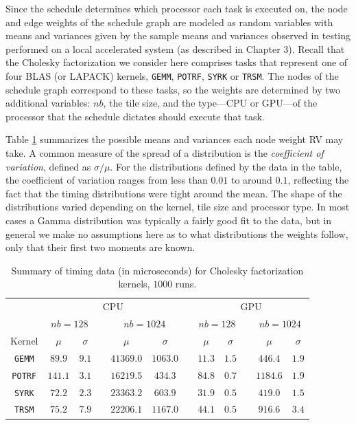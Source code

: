 \documentclass[12pt]{article}
\begin{document}
Since the schedule determines which processor each task is executed on, the node and edge weights of the schedule graph are modeled as random variables with means and variances given by the sample means and variances observed in testing performed on a local accelerated system (as described in Chapter 3). Recall that the Cholesky factorization we consider here comprises tasks that represent one of four BLAS (or LAPACK) kernels, {\tt GEMM}, {\tt POTRF}, {\tt SYRK} or {\tt TRSM}. The nodes of the schedule graph correspond to these tasks, so the weights are determined by two additional variables: $nb$, the tile size, and the type---CPU or GPU---of the processor that the schedule dictates should execute that task.

Table \ref{tb.cholesky_samples} summarizes the possible means and variances each node weight RV may take. A common measure of the spread of a distribution is the {\em coefficient of variation}, defined as $\sigma / \mu$. For the distributions defined by the data in the table, the coefficient of variation ranges from less than $0.01$ to around $0.1$, reflecting the fact that the timing distributions were tight around the mean. The shape of the distributions varied depending on the kernel, tile size and processor type. In most cases a Gamma distribution was typically a fairly good fit to the data, but in general we make no assumptions here as to what distributions the weights follow, only that their first two moments are known.           

\begin{table}
	\caption{Summary of timing data (in microseconds) for Cholesky factorization kernels, $1000$ runs.} 
	\begin{center}	
		\begin{tabular}{c c c c c c c c c c c c}
                  \toprule
                  & \multicolumn{5}{c}{CPU} && \multicolumn{5}{c}{GPU}    \\
                  \cmidrule{2-6} \cmidrule{8-12}
                  & \multicolumn{2}{c}{$nb = 128$} && \multicolumn{2}{c}{$nb = 1024$} &&  \multicolumn{2}{c}{$nb = 128$} && \multicolumn{2}{c}{$nb = 1024$}   \\
                  \cmidrule{2-3} \cmidrule{5-6} \cmidrule{8-9} \cmidrule{11-12}
                  Kernel & $\mu$ & $\sigma$ && $\mu$ & $\sigma$ && $\mu$ & $\sigma$ && $\mu$ & $\sigma$\\
                  \cmidrule{1-12}
                  {\tt GEMM} & $89.9$ & $9.1$ && $41369.0$ & $1063.0$ && $11.3$ & $1.5$ && $446.4$ & $1.9$ \\
                  {\tt POTRF} & $141.1$ & $3.1$ && $16219.5$ & $434.3$ && $84.8$ & $0.7$ && $1184.6$ & $1.9$ \\
                  {\tt SYRK} & $72.2$ & $2.3$ && $23363.2$ & $603.9$ && $31.9$ & $0.5$ && $419.0$ & $1.5$ \\
                  {\tt TRSM} & $75.2$ & $7.9$ && $22206.1$ & $1167.0$ && $44.1$ & $0.5$ && $916.6$ & $3.4$ \\
		\bottomrule
		\end{tabular}
		\label{tb.cholesky_samples}
	\end{center}	
      \end{table}
\end{document}
